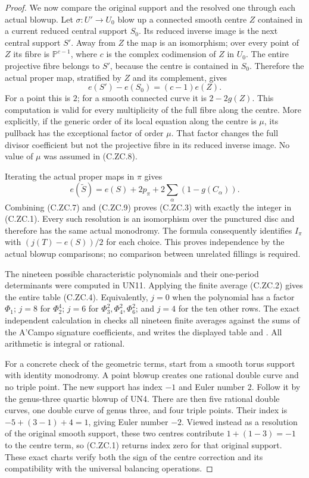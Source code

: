 \begin{proof}
We now compare the original support and
the resolved one through each actual
blowup. Let $\sigma:U'\to U_0$ blow up
a connected smooth centre $Z$ contained
in a current reduced central support
$S_0$. Its reduced inverse image is
the next central support $S'$. Away
from $Z$ the map is an isomorphism;
over every point of $Z$ its fibre is
$\mathbb P^{c-1}$, where $c$ is the
complex codimension of $Z$ in $U_0$.
The entire projective fibre belongs
to $S'$, because the centre is contained
in $S_0$. Therefore the actual proper
map, stratified by $Z$ and its complement,
gives
\[
                    e(S')-e(S_0)=(c-1)e(Z).
                                                               \tag{C.ZC.8}
\]
For a point this is $2$; for a smooth
connected curve it is $2-2g(Z)$.
This computation is valid for every
multiplicity of the full fibre along
the centre. More explicitly, if the
generic order of its local equation
along the centre is $\mu$, its pullback
has the exceptional factor of order
$\mu$. That factor changes the full
divisor coefficient but not the
projective fibre in its reduced
inverse image. No value of $\mu$
was assumed in (C.ZC.8).

Iterating the actual proper maps in
$\pi$ gives
\[
 e(\widetilde S)=e(S)+2p_\pi
                        +2\sum_\alpha(1-g(C_\alpha)).
                                                               \tag{C.ZC.9}
\]
Combining (C.ZC.7) and (C.ZC.9)
proves (C.ZC.3) with exactly the
integer in (C.ZC.1). Every such
resolution is an isomorphism over
the punctured disc and therefore
has the same actual monodromy.
The formula consequently identifies
$I_\pi$ with $(j(T)-e(S))/2$ for
each choice. This proves independence
by the actual blowup comparisons;
no comparison between unrelated
fillings is required.

The nineteen possible characteristic
polynomials and their one-period
determinants were computed in UN11.
Applying the finite average (C.ZC.2)
gives the entire table (C.ZC.4).
Equivalently, $j=0$ when the polynomial
has a factor $\Phi_1$; $j=8$ for
$\Phi_2^4$; $j=6$ for
$\Phi_3^2,\Phi_4^2,\Phi_6^2$;
and $j=4$ for the ten other rows.
The exact independent calculation
in 
checks all nineteen finite averages
against the sums of the A'Campo
signature coefficients, and writes
the displayed table and
.
All arithmetic is integral or rational.

For a concrete check of the geometric
terms, start from a smooth torus support
with identity monodromy. A point blowup
creates one rational double curve and
no triple point. The new support has
index $-1$ and Euler number $2$.
Follow it by the genus-three quartic
blowup of UN4. There are then five
rational double curves, one double
curve of genus three, and four triple
points. Their index is
$-5+(3-1)+4=1$, giving Euler number
$-2$. Viewed instead as a resolution
of the original smooth support, these
two centres contribute
$1+(1-3)=-1$ to the centre term,
so (C.ZC.1) returns index zero for
that original support. These exact
charts verify both the sign of the
centre correction and its compatibility
with the universal balancing operations.
\end{proof}
